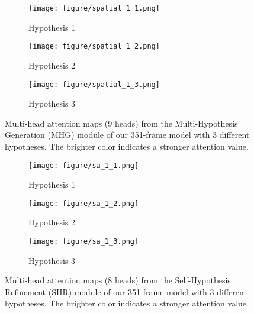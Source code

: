 \documentclass[10pt,twocolumn,letterpaper]{article}
\begin{document}
\begin{figure*}[!htb]
   \centering
   \begin{subfigure}[htb]{0.33\textwidth}
      \texttt{[image: figure/spatial\_1\_1.png]}
      \caption{Hypothesis 1}
      \label{fig:spatial_1}
   \end{subfigure}
   \begin{subfigure}[htb]{0.33\textwidth}
      \texttt{[image: figure/spatial\_1\_2.png]}
      \caption{Hypothesis 2}
      \label{fig:spatial_2}
   \end{subfigure}
   \begin{subfigure}[htb]{0.33\textwidth}
      \texttt{[image: figure/spatial\_1\_3.png]}
      \caption{Hypothesis 3}
      \label{fig:spatial_3}
   \end{subfigure}
   \caption
   {
      Multi-head attention maps (9 heads) from the Multi-Hypothesis Generation (MHG) module of our 351-frame model with 3 different hypotheses. 
      The brighter color indicates a stronger attention value. 
   }
   \label{fig:spatial}
\end{figure*}

\begin{figure*}[!htb]
   \centering
   \begin{subfigure}[htb]{0.497\textwidth}
      \texttt{[image: figure/sa\_1\_1.png]}
      \caption{Hypothesis 1}
      \label{fig:temporal_1}
   \end{subfigure}
   \begin{subfigure}[htb]{0.497\textwidth}
      \texttt{[image: figure/sa\_1\_2.png]}
      \caption{Hypothesis 2}
      \label{fig:temporal_2}
   \end{subfigure}
   \begin{subfigure}[htb]{0.497\textwidth}
      \texttt{[image: figure/sa\_1\_3.png]}
      \caption{Hypothesis 3}
      \label{fig:temporal_3}
   \end{subfigure}
   \caption
   {
      Multi-head attention maps (8 heads) from the Self-Hypothesis Refinement (SHR) module of our 351-frame model with 3 different hypotheses. 
      The brighter color indicates a stronger attention value. 
   }
   \label{fig:temporal}
\end{figure*}
\end{document}
